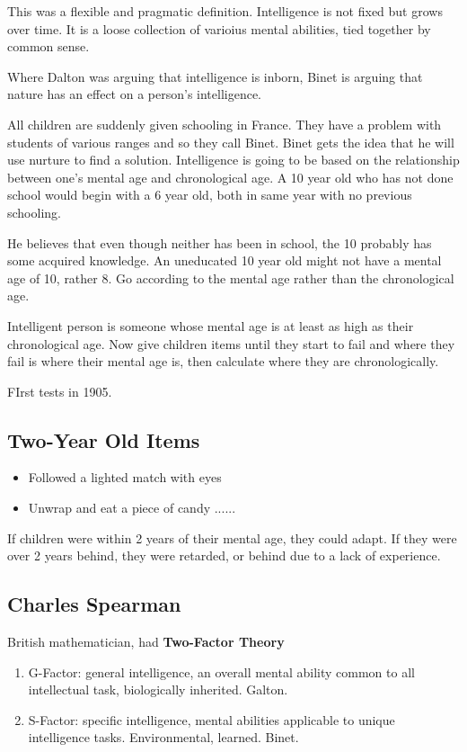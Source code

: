 \documentclass[12pt]{article}
\begin{document}
This was a flexible and pragmatic definition. Intelligence is not fixed but grows over time. It is a loose collection of varioius mental abilities, tied together by common sense. 

Where Dalton was arguing that intelligence is inborn, Binet is arguing that nature has an effect on a person's intelligence. 

All children are suddenly given schooling in France. They have a problem with students of various ranges and so they call Binet. Binet gets the idea that he will use nurture to find a solution. Intelligence is going to be based on the relationship between one's mental age and chronological age. A 10 year old who has not done school would begin with a 6 year old, both in same year with no previous schooling.

He believes that even though neither has been in school, the 10 probably has some acquired knowledge. An uneducated 10 year old might not have a mental age of 10, rather 8. Go according to the mental age rather than the chronological age.

Intelligent person is someone whose mental age is at least as high as their chronological age. Now give children items until they start to fail and where they fail is where their mental age is, then calculate where they are chronologically.

FIrst tests in 1905.

\subsection{Two-Year Old Items}
\begin{itemize}
  \item Followed a lighted match with eyes
  \item Unwrap and eat a piece of candy ......
\end{itemize}

If children were within 2 years of their mental age, they could adapt. If they were over 2 years behind, they were retarded, or behind due to a lack of experience. 

\subsection*{Charles Spearman}
British mathematician, had \textbf{Two-Factor Theory}

\begin{enumerate}
  \item G-Factor: general intelligence, an overall mental ability common to all intellectual task, biologically inherited. Galton.
  \item S-Factor: specific intelligence, mental abilities applicable to unique intelligence tasks. Environmental, learned. Binet.
\end{enumerate}
\end{document}
